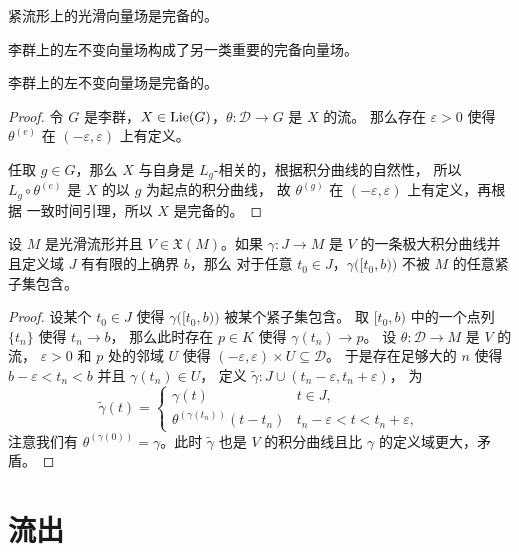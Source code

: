 \begin{corollary}
  紧流形上的光滑向量场是完备的。
\end{corollary}

李群上的左不变向量场构成了另一类重要的完备向量场。

\begin{theorem}
  李群上的左不变向量场是完备的。
\end{theorem}
\begin{proof}
  令 $G$ 是李群，$X\in\operatorname{Lie}(G)$，$\theta:\mathcal{D}\to G$ 是 $X$ 的流。
  那么存在 $\varepsilon>0$ 使得 $\theta^{(e)}$ 在 $(-\varepsilon,\varepsilon)$ 上有定义。

  任取 $g\in G$，那么 $X$ 与自身是 $L_g$-相关的，根据积分曲线的自然性，
  所以 $L_g\circ \theta^{(e)}$ 是 $X$ 的以 $g$ 为起点的积分曲线，
  故 $\theta^{(g)}$ 在 $(-\varepsilon,\varepsilon)$ 上有定义，再根据
  一致时间引理，所以 $X$ 是完备的。
\end{proof}

\begin{lemma}[逃脱引理]
  设 $M$ 是光滑流形并且 $V\in \mathfrak{X}(M)$。如果 $\gamma:J\to M$
  是 $V$ 的一条极大积分曲线并且定义域 $J$ 有有限的上确界 $b$，那么
  对于任意 $t_0\in J$，$\gamma\bigl([t_0,b)\bigr)$ 不被 $M$
  的任意紧子集包含。
\end{lemma}
\begin{proof}
  设某个 $t_0\in J$ 使得 $\gamma\bigl([t_0,b)\bigr)$ 被某个紧子集包含。
  取 $[t_0,b)$ 中的一个点列 $\{t_n\}$ 使得 $t_n\to b$，
  那么此时存在 $p\in K$ 使得 $\gamma(t_n)\to p$。
  设 $\theta: \mathcal{D}\to M$ 是 $V$ 的流， $\varepsilon>0$ 和 $p$
  处的邻域 $U$ 使得 $(-\varepsilon,\varepsilon)\times U\subseteq \mathcal{D}$。
  于是存在足够大的 $n$ 使得 $b-\varepsilon<t_n<b$ 并且 $\gamma(t_n)\in U$，
  定义 $\tilde{\gamma}:J\cup (t_n-\varepsilon,t_n+\varepsilon)$，
  为
  \[
    \tilde{\gamma}(t)=\begin{cases}
      \gamma(t) & t\in J,\\
      \theta^{(\gamma(t_n))}(t-t_n) & t_n-\varepsilon<t<t_n+\varepsilon,
    \end{cases}
  \]
  注意我们有 $\theta^{(\gamma(0))}=\gamma$。此时 $\tilde \gamma$ 也是 $V$
  的积分曲线且比 $\gamma$ 的定义域更大，矛盾。  
\end{proof}

\section{流出}



